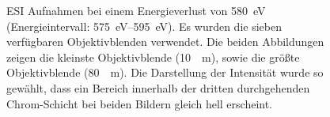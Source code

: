 \documentclass[
	paper=a4,				%
	twoside=true,			%
	BCOR=6mm,				%
	fontsize=12pt,			%
	pagesize=auto,			%
	numbers=noenddot,		%
	bibliography=totoc,		%
	draft=false
]{scrartcl}
\begin{document}
\begin{figure}
	\centering
	\caption[ESI Aufnahmen bei einem Energieverlust von \SI{580}{eV}]{ESI Aufnahmen bei einem Energieverlust von \SI{580}{eV} (Energieintervall: \SIrange{575}{595}{eV}). Es wurden die sieben verfügbaren Objektivblenden verwendet. Die beiden Abbildungen zeigen die kleinste Objektivblende (\SI{10}{\mu\meter}), sowie die größte Objektivblende (\SI{80}{\mu\meter}). Die Darstellung der Intensität wurde so gewählt, dass ein Bereich innerhalb der dritten durchgehenden Chrom-Schicht bei beiden Bildern gleich hell erscheint.}
	\label{fig:ESI_Objektivblende_580eV}
\end{figure}
\end{document}
